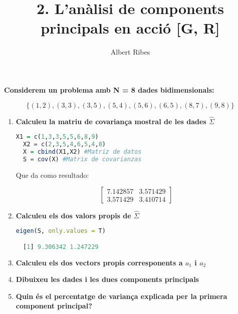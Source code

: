 \documentclass[a4paper,10pt]{article}
\title{2. L'anàlisi de components principals en acció [G, R]}
\author{Albert Ribes}
\begin{document}
\maketitle

%


\textbf{
Considerem un problema amb N = 8 dades bidimensionals:
}

\begin{equation*}
  \{(1, 2), (3, 3), (3, 5), (5, 4), (5, 6), (6, 5), (8, 7), (9, 8)\}
\end{equation*}

\begin{enumerate}
  \item \textbf{Calculeu la matriu de covariança mostral de les dades $\hat{\Sigma}$}
  \begin{lstlisting}[language=R]
  X1 = c(1,3,3,5,5,6,8,9)
  X2 = c(2,3,5,4,6,5,4,8)
  X = cbind(X1,X2) #Matriz de datos
  S = cov(X) #Matrix de covarianzas
\end{lstlisting}

Que da como resultado:

\begin{equation*}
\begin{bmatrix}
  7.142857 & 3.571429 \\
  3.571429 & 3.410714
\end{bmatrix}
\end{equation*}

  \item \textbf{Calculeu els dos valors propis de $\hat{\Sigma}$}
  \begin{lstlisting}[language=R]
  eigen(S, only.values = T)

  [1] 9.306342 1.247229
\end{lstlisting}




  \item \textbf{Calculeu els dos vectors propis corresponents a $a_1$ i $a_2$}

  \item \textbf{Dibuixeu les dades i les dues components principals}

  \item \textbf{Quin és el percentatge de variança explicada per la primera component principal?}
\end{enumerate}
\end{document}
